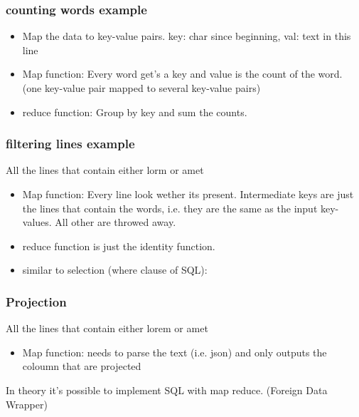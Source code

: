 \subsubsection{counting words example}
\begin{itemize}
    \item Map the data to key-value pairs. key: char since beginning, val: text in this line
    \item Map function: Every word get's a key and value is the count
    of the word. (one key-value pair mapped to several key-value pairs)
    \item reduce function: Group by key and sum the counts.
\end{itemize}
\subsubsection{filtering lines example}
All the lines that contain either lorm or amet
\begin{itemize}
    \item Map function: Every line look wether its present. Intermediate keys are just the lines that contain the words,
    i.e. they are the same as the input key-values. All other are throwed away.
    \item reduce function is just the identity function.
    \item similar to selection (where clause of SQL):
\end{itemize}
\subsubsection{Projection}
All the lines that contain either lorem or amet
\begin{itemize}
    \item Map function: needs to parse the text (i.e. json) and only outputs the coloumn that are projected
\end{itemize}
In theory it's possible to implement SQL with map reduce. (Foreign Data Wrapper)

